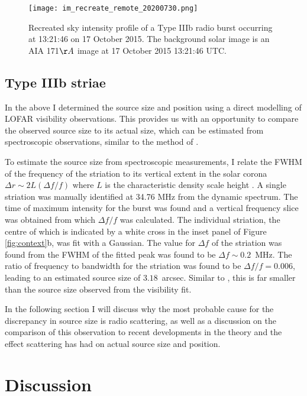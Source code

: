 \begin{figure}
    \centering
    \texttt{[image: im\_recreate\_remote\_20200730.png]}
    \caption[Recreated sky intensity profile of a Type IIIb radio burst.]{Recreated sky intensity profile of a Type IIIb radio burst occurring at 13:21:46 on 17 October 2015. The background solar image is an AIA 171$\AA$ image at 17 October 2015 13:21:46 UTC.} 
    \label{fig:recreate}
\end{figure}


\subsection{Type IIIb striae}
In the above I determined the source size and position using a direct modelling of LOFAR visibility observations. This provides us with an opportunity to compare the observed source size to its actual size, which can be estimated from spectroscopic observations, similar to the method of \cite{Kontar2017}.

To estimate the source size from spectroscopic measurements, I relate the FWHM of the frequency of the striation to its vertical extent in the solar corona $\Delta r {\sim} 2L \left(\Delta f/f\right)$ where $L$ is the characteristic density scale height \citep{Kontar2017}.
A single striation was manually identified at 34.76 MHz from the dynamic spectrum. The time of maximum intensity for the burst was found and a vertical frequency slice was obtained from which $\Delta f/f$ was calculated. The individual striation, the centre of which is indicated by a white cross in the inset panel of Figure \ref{fig:context}b, was fit with a Gaussian. The value for $\Delta f$ of the striation was found from the FWHM of the fitted peak was found to be $\Delta f \sim 0.2$~MHz. The ratio of frequency to bandwidth for the striation was found to be $\Delta f/f = 0.006$, leading to an estimated source size of $3.18$~arcsec. 
Similar to \cite{Kontar2017}, this is far smaller than the source size observed from the visibility fit.

In the following section I will discuss why the most probable cause for the discrepancy in source size is radio scattering, as well as a discussion on the comparison of this observation to recent developments in the theory and the effect scattering has had on actual source size and position.

\section{Discussion}\label{sec:conclusion}

